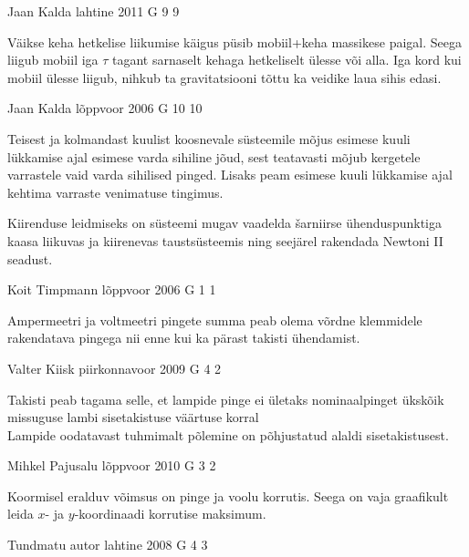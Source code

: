 \documentclass[11pt]{article}
\begin{document}
{%
{Jaan Kalda} %
{lahtine} %
{2011} %
{G 9} %
{9} %
{

\ifHint
Väikse keha hetkelise liikumise käigus püsib mobiil+keha massikese paigal. Seega liigub mobiil iga $\tau$ tagant sarnaselt kehaga hetkeliselt ülesse või alla. Iga kord kui mobiil ülesse liigub, nihkub ta gravitatsiooni tõttu ka veidike laua sihis edasi.
\fi
}

{Jaan Kalda} %
{lõppvoor} %
{2006} %
{G 10} %
{10} %
{

\ifHint
Teisest ja kolmandast kuulist koosnevale süsteemile mõjus esimese kuuli lükkamise ajal esimese varda sihiline jõud, sest teatavasti mõjub kergetele varrastele vaid varda sihilised pinged. Lisaks peam esimese kuuli lükkamise ajal kehtima varraste venimatuse tingimus.

Kiirenduse leidmiseks on süsteemi mugav vaadelda šarniirse ühenduspunktiga kaasa liikuvas ja kiirenevas taustsüsteemis ning seejärel rakendada Newtoni II seadust.
\fi
}

{Koit Timpmann} %
{lõppvoor} %
{2006} %
{G 1} %
{1} %
{

\ifHint
Ampermeetri ja voltmeetri pingete summa peab olema võrdne klemmidele rakendatava pingega nii enne kui ka pärast takisti ühendamist.
\fi
}

{Valter Kiisk} %
{piirkonnavoor} %
{2009} %
{G 4} %
{2} %
{

\ifHint
\osa Takisti peab tagama selle, et lampide pinge ei ületaks nominaalpinget ükskõik missuguse lambi sisetakistuse väärtuse korral\\
\osa Lampide oodatavast tuhmimalt põlemine on põhjustatud alaldi sisetakistusest.
\fi
}

{Mihkel Pajusalu} %
{lõppvoor} %
{2010} %
{G 3} %
{2} %
{

\ifHint
Koormisel eralduv võimsus on pinge ja voolu korrutis. Seega on vaja graafikult leida $x$- ja $y$-koordinaadi korrutise maksimum.
\fi
}

{Tundmatu autor} %
{lahtine} %
{2008} %
{G 4} %
{3} %
{

}}
\end{document}
